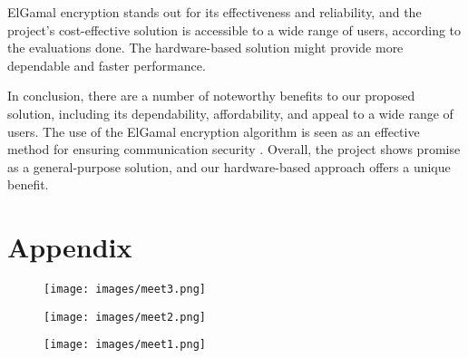 \documentclass[12pt]{article}
\begin{document}
	ElGamal encryption stands out for its effectiveness and reliability, and the project's cost-effective solution is accessible to a wide range of users, according to the evaluations done. The hardware-based solution might provide more dependable and faster performance.
	
In conclusion, there are a number of noteworthy benefits to our proposed solution, including its dependability, affordability, and appeal to a wide range of users. The use of the ElGamal encryption algorithm is seen as an effective method for ensuring communication security	\cite{van1999fundamentals}. Overall, the project shows promise as a general-purpose solution, and our hardware-based approach offers a unique benefit.
	\newpage



	\newpage
	\section{Appendix}
	\begin{figure}[H]
	\centering
	\label{Meeting1}
	\texttt{[image: images/meet3.png]}\\[0.5 cm]			
\end{figure}
	\begin{figure}[H]
	\centering
	\label{Meeting2}
	\texttt{[image: images/meet2.png]}\\[0.5 cm]			
\end{figure}
	\begin{figure}[H]
	\centering
	\label{Meeting3}
	\texttt{[image: images/meet1.png]}\\[0.5 cm]			
\end{figure}
	
	
\end{document}
